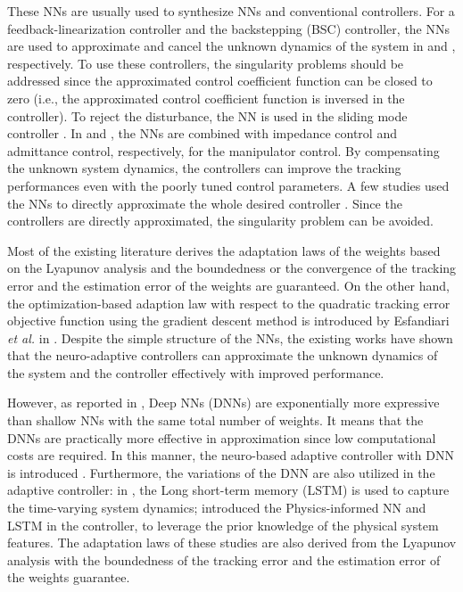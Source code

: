 \documentclass[lettersize,journal]{IEEEtran}
\begin{document}
These NNs are usually used to synthesize NNs and conventional controllers.
For a feedback-linearization controller and the backstepping (BSC) controller, the NNs are used to approximate and cancel the unknown dynamics of the system in \cite{RN44, RN56} and \cite{RN10, RN31, RN57}, respectively. 
To use these controllers, the singularity problems should be addressed since the approximated control coefficient function can be closed to zero (i.e., the approximated control coefficient function is inversed in the controller).
To reject the disturbance, the NN is used in the sliding mode controller \cite{RN7}.
In \cite{RN34} and \cite{RN37}, the NNs are combined with impedance control and admittance control, respectively, for the manipulator control.
By compensating the unknown system dynamics, the controllers can improve the tracking performances even with the poorly tuned control parameters.
A few studies used the NNs to directly approximate the whole desired controller \cite{RN54, RN3}.
Since the controllers are directly approximated, the singularity problem can be avoided.

Most of the existing literature derives the adaptation laws of the weights based on the Lyapunov analysis and the boundedness or the convergence of the tracking error and the estimation error of the weights are guaranteed.
On the other hand, the optimization-based adaption law with respect to the quadratic tracking error objective function using the gradient descent method is introduced by Esfandiari \textit{et al.} in \cite{RN56, RN54, RN3}.
Despite the simple structure of the NNs, the existing works have shown that the neuro-adaptive controllers can approximate the unknown dynamics of the system and the controller effectively with improved performance.

However, as reported in \cite{RN25}, Deep NNs (DNNs) are exponentially more expressive than shallow NNs with the same total number of weights.
It means that the DNNs are practically more effective in approximation since low computational costs are required.
In this manner, the neuro-based adaptive controller with DNN is introduced \cite{RN16}. 
Furthermore, the variations of the DNN are also utilized in the adaptive controller: 
in \cite{RN14}, the Long short-term memory (LSTM) is used to capture the time-varying system dynamics; 
\cite{RN15} introduced the Physics-informed NN and LSTM in the controller, to leverage the prior knowledge of the physical system features.
The adaptation laws of these studies are also derived from the Lyapunov analysis with the boundedness of the tracking error and the estimation error of the weights guarantee.
\end{document}
